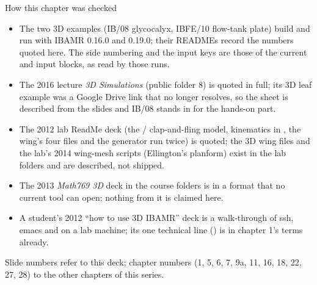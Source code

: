 \documentclass[aspectratio=169,11pt]{beamer}
\begin{document}
\begin{frame}{How this chapter was checked}
\label{fr:checked}
\begin{itemize}\footnotesize
  \item The two 3D examples (IB/08 glycocalyx, IBFE/10 flow-tank plate) build and run with IBAMR 0.16.0 and 0.19.0; their READMEs record the numbers quoted here. The side numbering and the input keys are those of the current  and  input blocks, as read by those runs.
  \item The 2016 lecture \emph{3D Simulations} (public folder 8) is quoted in full; its 3D leaf example was a Google Drive link that no longer resolves, so the sheet is described from the slides and IB/08 stands in for the hands-on part.
  \item The 2012 lab ReadMe deck (the / clap-and-fling model, kinematics in , the wing's four files and the generator run twice) is quoted; the 3D wing files and the lab's 2014 wing-mesh scripts (Ellington's planform) exist in the lab folders and are described, not shipped.
  \item The 2013 \emph{Math769 3D} deck in the course folders is in a format that no current tool can open; nothing from it is claimed here.
  \item A student's 2012 ``how to use 3D IBAMR'' deck is a walk-through of ssh, emacs and  on a lab machine; its one technical line () is in chapter 1's terms already.
\end{itemize}
\begin{punchbox}
\footnotesize Slide numbers refer to this deck; chapter numbers (1, 5, 6, 7, 9a, 11, 16, 18, 22, 27, 28) to the other chapters of this series.
\end{punchbox}
\end{frame}
\end{document}
